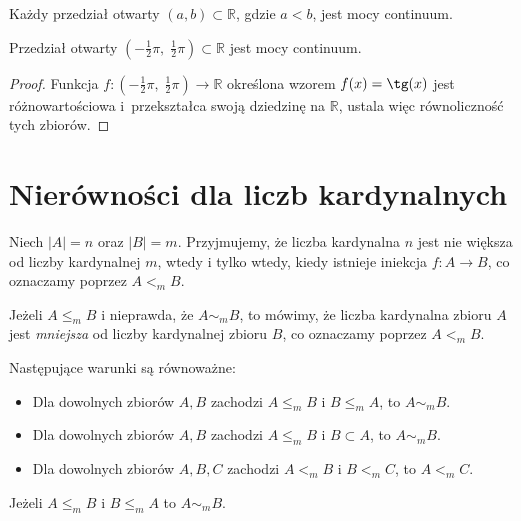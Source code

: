	\begin{przyk}
		Każdy przedział otwarty $(a, b) \subset \mathbb{R}$, gdzie $a < b$, jest mocy continuum.
	\end{przyk}
	
	\begin{przyk}
		Przedział otwarty $(-\frac{1}{2}\pi, \; \frac{1}{2}\pi) \subset \mathbb{R}$ jest mocy continuum. 				
		\begin{proof}
			Funkcja $f:(-\frac{1}{2}\pi, \; \frac{1}{2}\pi) \to \mathbb{R}$ określona wzorem $f(x) = \tg(x)$ jest różnowartościowa i~przekształca swoją dziedzinę na $\mathbb{R}$, ustala więc równoliczność tych zbiorów.
		\end{proof}
	\end{przyk}
	
	\section{Nierówności dla liczb kardynalnych}
	\begin{df}
		Niech $|A|= n$ oraz $|B| = m$. Przyjmujemy, że liczba kardynalna $n$ jest nie większa od liczby kardynalnej $m$, wtedy i tylko wtedy, kiedy istnieje iniekcja $f:A \to B$, co oznaczamy poprzez $A <_m B$.
	\end{df}
	
	\begin{df}
	 Jeżeli $A  \leq_m  B$ i nieprawda, że $A  \sim_m  B$, to mówimy, że liczba kardynalna zbioru $A$ jest \textit{mniejsza} od liczby kardynalnej zbioru $B$, co oznaczamy poprzez $A <_m B$.
	\end{df}
	
	\begin{tw}
		Następujące warunki są równoważne:
		\begin{itemize}
			\item	Dla dowolnych zbiorów $A,B$ zachodzi $A  \leq_m  B$ i $B  \leq_m  A$, to $ A  \sim_m  B$.
			\item	Dla dowolnych zbiorów $A,B$ zachodzi $A  \leq_m  B$ i $B \subset  A$, to $ A  \sim_m  B$.
			\item	Dla dowolnych zbiorów $A,B,C$ zachodzi $A  <_m  B$ i  $B <_m C$, to $A  <_m  C$.
		\end{itemize}
	\end{tw}
	
	\begin{tw}
		Jeżeli $A  \leq_m  B$ i $B  \leq_m  A$ to $A  \sim_m  B$.
	\end{tw}
	

